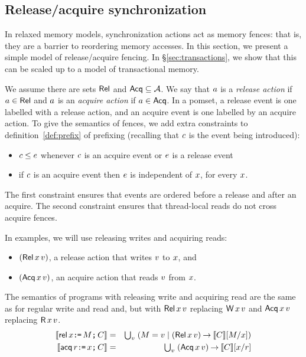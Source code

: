 \subsection{Release/acquire synchronization}
\label{sec:ra}

In relaxed memory models, synchronization actions act as memory fences: that
is, they are a barrier to reordering memory accesses.  In this section, we
present a simple model of release/acquire fencing. In
\S\ref{sec:transactions}, we show that this can be scaled up to a model of
transactional memory.

We assume there are sets $\mathsf{Rel}$ and $\mathsf{Acq} \subseteq\mathcal{A}$.  We say that
$a$ is a \emph{release action} if $a\in\mathsf{Rel}$ and $a$ is an
\emph{acquire action} if $a\in\mathsf{Acq}$.
In a pomset, a release event is one labelled with a release action,
and an acquire event is one labelled by an acquire action.
To give the semantics of fences, we add extra constraints
to definition~\ref{def:prefix} of prefixing %
(recalling that $c$ is the %
event being introduced):
\begin{itemize}
\item $c \le e$ whenever $c$ is an acquire event or $e$ is a release event
\item if $c$ is an acquire event then $e$ is independent of $x$,
  for every $x$.
\end{itemize}
The first constraint ensures that events are ordered before a release and
after an acquire.  The second constraint ensures that thread-local reads do
not cross acquire fences.

In examples, we will use
releasing writes and acquiring reads:
\begin{itemize}
\item $(\DWRel{\aLoc}{\aVal})$, a release action that writes $v$ to $x$, and
\item $(\DRAcq{\aLoc}{\aVal})$, an acquire action that reads $v$ from $x$.
\end{itemize}
The semantics of programs with releasing write and acquiring read are the
same as for regular write and read and, but with $\DWRel\aLoc\aVal$ replacing
$\DW\aLoc\aVal$ and $\DRAcq\aLoc\aVal$ replacing $\DR\aLoc\aVal$.  
\begin{eqnarray*}
  \sem{\REL\aLoc\GETS\aExp\SEMI \aCmd} & = & \textstyle\bigcup_\aVal\; (\aExp=\aVal \mid (\DWRel\aLoc\aVal) \prefix \sem{\aCmd}[\aExp/\aLoc]) \\
  \sem{\ACQ\aReg\GETS\aLoc\SEMI \aCmd} & = & \textstyle\bigcup_\aVal\; (\DRAcq\aLoc\aVal) \prefix \sem{\aCmd}[\aLoc/\aReg]
\end{eqnarray*}

